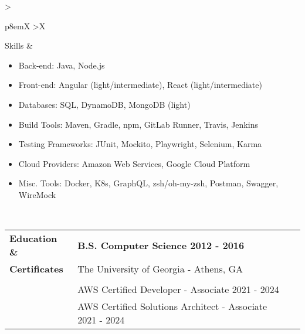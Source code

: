 \documentclass[final]{letter}
\begin{document}
	\begin{tabularx}{\linewidth}{
		>{\raggedright\bf\Large}p{8em}X
		>{\centering}X
	} 
		Skills & \begin{itemize}[topsep=1pt,noitemsep]
			\item[] Back-end: \tab Java, Node.js
			\item[] Front-end: \tab Angular (light/intermediate), React (light/intermediate)
			\item[] Databases: \tab SQL, DynamoDB, MongoDB (light)
			\item[] Build Tools: \tab Maven, Gradle, npm, GitLab Runner, Travis, Jenkins
			\item[] Testing Frameworks: \tab JUnit, Mockito, Playwright, Selenium, Karma
			\item[] Cloud Providers: \tab Amazon Web Services, Google Cloud Platform
			\item[] Misc. Tools: \tab Docker, K8s, GraphQL, zsh/oh-my-zsh, Postman, Swagger, WireMock
		\end{itemize}
	\end{tabularx} \\

	\begin{tabularx}{\linewidth} {
		>{\raggedright\bf\Large}p{10em}X
		>{\centering}X
	} 
		Education \normalsize\& & \large\bf{B.S. Computer Science \hfill 2012 - 2016} \\
		Certificates & The University of Georgia - Athens, GA \\
		& \\
		& AWS Certified Developer - Associate \hfill 2021 - 2024 \\
		& AWS Certified Solutions Architect - Associate \hfill 2021 - 2024
	\end{tabularx}
\end{document}
